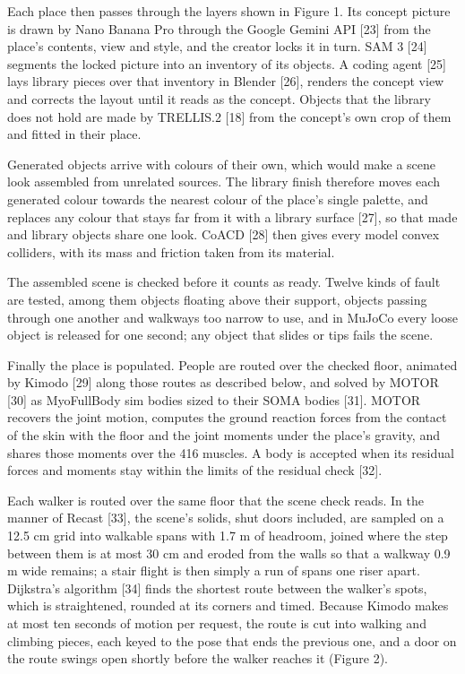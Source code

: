 \documentclass[
  11pt,
]{article}
\begin{document}
Each place then passes through the layers shown in Figure 1. Its concept
picture is drawn by Nano Banana Pro through the Google Gemini API
{[}23{]} from the place's contents, view and style, and the creator
locks it in turn. SAM 3 {[}24{]} segments the locked picture into an
inventory of its objects. A coding agent {[}25{]} lays library pieces
over that inventory in Blender {[}26{]}, renders the concept view and
corrects the layout until it reads as the concept. Objects that the
library does not hold are made by TRELLIS.2 {[}18{]} from the concept's
own crop of them and fitted in their place.

Generated objects arrive with colours of their own, which would make a
scene look assembled from unrelated sources. The library finish
therefore moves each generated colour towards the nearest colour of the
place's single palette, and replaces any colour that stays far from it
with a library surface {[}27{]}, so that made and library objects share
one look. CoACD {[}28{]} then gives every model convex colliders, with
its mass and friction taken from its material.

The assembled scene is checked before it counts as ready. Twelve kinds
of fault are tested, among them objects floating above their support,
objects passing through one another and walkways too narrow to use, and
in MuJoCo every loose object is released for one second; any object that
slides or tips fails the scene.

Finally the place is populated. People are routed over the checked
floor, animated by Kimodo {[}29{]} along those routes as described
below, and solved by MOTOR {[}30{]} as MyoFullBody sim bodies sized to
their SOMA bodies {[}31{]}. MOTOR recovers the joint motion, computes
the ground reaction forces from the contact of the skin with the floor
and the joint moments under the place's gravity, and shares those
moments over the 416 muscles. A body is accepted when its residual
forces and moments stay within the limits of the residual check
{[}32{]}.

Each walker is routed over the same floor that the scene check reads. In
the manner of Recast {[}33{]}, the scene's solids, shut doors included,
are sampled on a 12.5 cm grid into walkable spans with 1.7 m of
headroom, joined where the step between them is at most 30 cm and eroded
from the walls so that a walkway 0.9 m wide remains; a stair flight is
then simply a run of spans one riser apart. Dijkstra's algorithm
{[}34{]} finds the shortest route between the walker's spots, which is
straightened, rounded at its corners and timed. Because Kimodo makes at
most ten seconds of motion per request, the route is cut into walking
and climbing pieces, each keyed to the pose that ends the previous one,
and a door on the route swings open shortly before the walker reaches it
(Figure 2).
\end{document}
